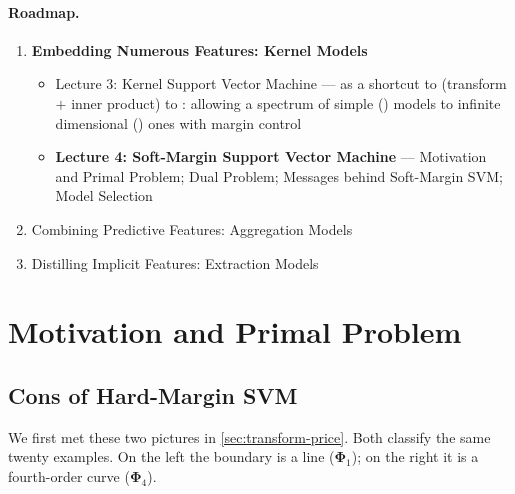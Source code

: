 \paragraph{Roadmap.}
\begin{enumerate}
    \item \textbf{Embedding Numerous Features: Kernel Models}
        \begin{itemize}
            \item[] Lecture 3: Kernel Support Vector Machine ---
                 as a shortcut to (transform \(+\) inner
                product) to : allowing a spectrum of simple
                () models to infinite dimensional
                () ones with margin control
            \item[] \textbf{Lecture 4: Soft-Margin Support Vector Machine}
                --- Motivation and Primal Problem; Dual Problem; Messages
                behind Soft-Margin SVM; Model Selection
        \end{itemize}
    \item Combining Predictive Features: Aggregation Models
    \item Distilling Implicit Features: Extraction Models
\end{enumerate}

\section{Motivation and Primal Problem}\label{sec:soft-primal}


\subsection{Cons of Hard-Margin SVM}

\begin{recall}
\end{recall}

We first met these two pictures in \autoref{sec:transform-price}. Both
classify the same twenty examples. On the left the boundary is a line
(\(\bm{\Phi}_1\)); on the right it is a fourth-order curve
(\(\bm{\Phi}_4\)).

